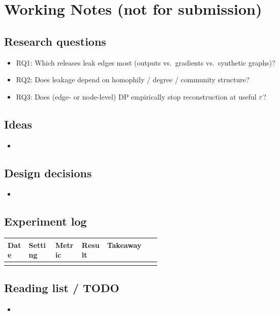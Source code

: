 \section{Working Notes (not for submission)}
\label{app:notes}

\subsection*{Research questions}
\begin{itemize}
  \item RQ1: Which releases leak edges most (outputs vs.\ gradients vs.\ synthetic graphs)?
  \item RQ2: Does leakage depend on homophily / degree / community structure?
  \item RQ3: Does (edge- or node-level) DP empirically stop reconstruction at useful $\varepsilon$?
\end{itemize}

\subsection*{Ideas}
\begin{itemize}
  \item \idea{}
\end{itemize}

\subsection*{Design decisions}
\begin{itemize}
  \item
\end{itemize}

\subsection*{Experiment log}
\begin{center}
\small
\begin{tabular}{@{}llllp{0.35\linewidth}@{}}
  \toprule
  Date & Setting & Metric & Result & Takeaway \\
  \midrule
   & & & & \\
  \bottomrule
\end{tabular}
\end{center}

\subsection*{Reading list / TODO}
\begin{itemize}
  \item
\end{itemize}
